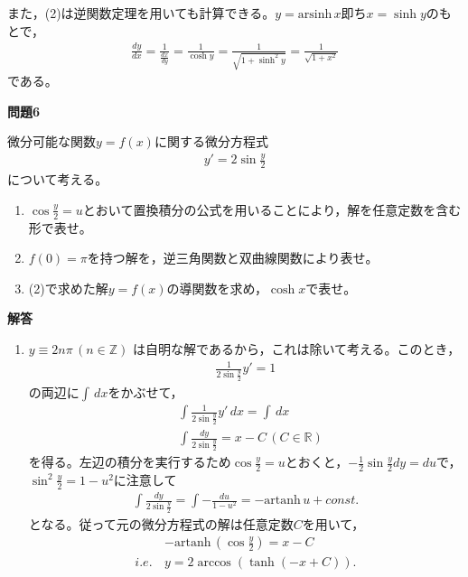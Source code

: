 \documentclass[a4paper,12pt,dvipdfmx,fleqn, oneside]{jsarticle}
\theoremstyle{defstyle}
\theoremstyle{thmx}
\theoremstyle{qesstyle}
\begin{document}
また，(2)は逆関数定理を用いても計算できる。$ y = \text{arsinh}\, x $即ち$x = \sinh y$のもとで，
\begin{align*}
    \frac{dy}{dx} = \frac{1}{\frac{dx}{dy}}= \frac{1}{\cosh y} = \frac{1}{\sqrt{1 + \sinh^2 y }}= \frac{1}{\sqrt{1+x^2}}
\end{align*}
である。

\begin{shadebox}
    \textbf{問題6}

    \text{　}微分可能な関数$y=f(x)$に関する微分方程式
    \begin{align*}
        y'=2 \sin \frac{y}{2}
    \end{align*}
    について考える。
    \begin{enumerate}
        \item $\cos \frac{y}{2}=u$とおいて置換積分の公式を用いることにより，解を任意定数を含む形で表せ。
        \item $f(0)= \pi $を持つ解を，逆三角関数と双曲線関数により表せ。
        \item (2)で求めた解$y=f(x)$の導関数を求め，$\cosh x$で表せ。
    \end{enumerate}
\end{shadebox}
\begin{screen}
    \textbf{解答}
    \begin{enumerate}
        \item $y \equiv  2n \pi \, (n \in \mathbb{Z})$ は自明な解であるから，これは除いて考える。このとき，
              \begin{align*}
                  \frac{1}{2 \sin \frac{y}{2}} y' = 1
              \end{align*}
              の両辺に$\int \, dx$をかぶせて，
              \begin{align*}
                   & \int \frac{1}{2 \sin \frac{y}{2}} y' \, dx = \int  \, dx         \\
                   & \int \frac{dy}{2 \sin \frac{y}{2}} = x - C \, (C \in \mathbb{R})
              \end{align*}
              を得る。左辺の積分を実行するため$\cos \frac{y}{2} = u$とおくと，$- \frac{1}{2}\sin \frac{y}{2} dy = du$で，$\sin^2 \frac{y}{2} = 1- u^2$に注意して
              \begin{align*}
                  \int \frac{dy}{2 \sin \frac{y}{2}} = \int -\frac{du}{1-u^2} = - \text{artanh}\,  u+ const.
              \end{align*}
              となる。従って元の微分方程式の解は任意定数$C$を用いて，
              \begin{align*}
                         & -\text{artanh} \, (\cos \frac{y}{2})  = x - C             \\
                  i.e.\, & y                             = 2 \arccos (\tanh (-x+C)).
              \end{align*}
    \end{enumerate}
\end{screen}
\end{document}
